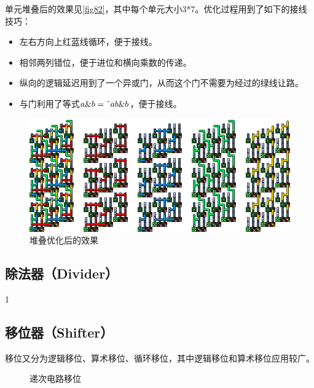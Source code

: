 单元堆叠后的效果见\autoref{fig82}，其中每个单元大小3*7。优化过程用到了如下的接线技巧：
\begin{itemize}
	\item 左右方向上红蓝线循环，便于接线。
	\item 相邻两列错位，便于进位和横向乘数的传递。
	\item 纵向的逻辑延迟用到了一个异或门，从而这个门不需要为经过的绿线让路。
	\item 与门利用了等式$a\&b=\textrm{\~{}} ab\&b$，便于接线。
\end{itemize}

\begin{figure}[!ht]
\centering
\includegraphics[width=\textwidth]{images/437.png}
\caption{堆叠优化后的效果}\label{fig82}
\end{figure}

\subsection{除法器（Divider）}
1
\subsection{移位器（Shifter）}
移位又分为逻辑移位、算术移位、循环移位，其中逻辑移位和算术移位应用较广。

\begin{figure}[!ht]
\centering
{}
\qquad
{}
\qquad
{}
\caption{递次电路移位}\label{fig40}
\end{figure}

